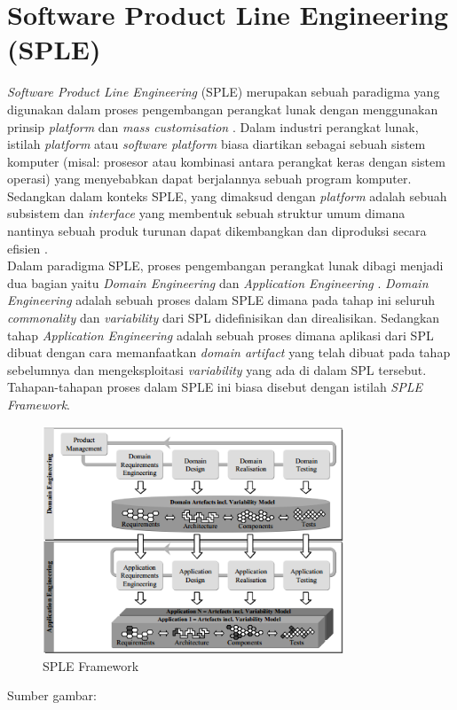\section{Software Product Line Engineering (SPLE)}
\noindent
\textit{Software Product Line Engineering} (SPLE) merupakan sebuah paradigma yang digunakan dalam proses pengembangan perangkat lunak dengan menggunakan prinsip \textit{platform} dan \textit{mass customisation} \citep[p.~14]{pohl2005software}. Dalam industri perangkat lunak, istilah \textit{platform} atau \textit{software platform} biasa diartikan sebagai sebuah sistem komputer (misal: prosesor atau kombinasi antara perangkat keras dengan sistem operasi) yang menyebabkan dapat berjalannya sebuah program komputer. Sedangkan dalam konteks SPLE, yang dimaksud dengan \textit{platform} adalah sebuah subsistem dan \textit{interface} yang membentuk sebuah struktur umum dimana nantinya sebuah produk turunan dapat dikembangkan dan diproduksi secara efisien \citep[p.~15]{pohl2005software}. \\

\noindent
Dalam paradigma SPLE, proses pengembangan perangkat lunak dibagi menjadi dua bagian yaitu \textit{Domain Engineering} dan \textit{Application Engineering} \citep[p.~21]{pohl2005software}. \textit{Domain Engineering} adalah sebuah proses dalam SPLE dimana pada tahap ini seluruh \textit{commonality} dan \textit{variability} dari SPL didefinisikan dan direalisikan. Sedangkan tahap \textit{Application Engineering} adalah sebuah proses dimana aplikasi dari SPL dibuat dengan cara memanfaatkan \textit{domain artifact} yang telah dibuat pada tahap sebelumnya dan mengeksploitasi \textit{variability} yang ada di dalam SPL tersebut. Tahapan-tahapan proses dalam SPLE ini biasa disebut dengan istilah \textit{SPLE Framework}. \\

\begin{figure}
    \centering
    \includegraphics[width=0.8\textwidth]
        {img/sple-process.png}
    \caption{SPLE Framework}
\end{figure}
\vspace{-0.8cm}
\begin{center}
{\small Sumber gambar: \citep{pohl2005software}}
\end{center}

